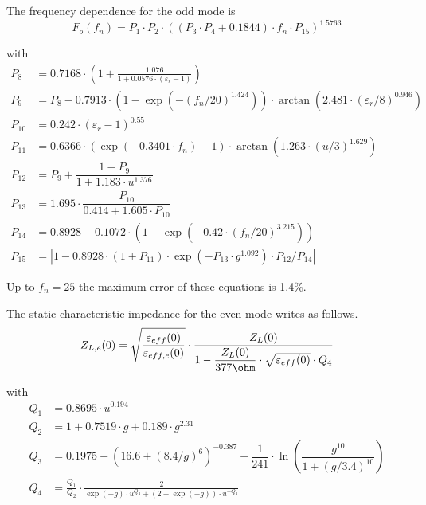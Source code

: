 \documentclass[10pt]{report}
\begin{document}
The frequency dependence for the odd mode is
\begin{equation}
F_o\left(f_n\right) = P_1\cdot P_2\cdot \left(\left(P_3\cdot P_4 + 0.1844\right)\cdot f_n\cdot P_{15}\right)^{1.5763}
\end{equation}

with
\begin{align}
P_8 &= 0.7168\cdot \left(1 + \frac{1.076}{1+0.0576\cdot \left(\varepsilon_r-1\right)} \right)\\
P_9 &= P_8 - 0.7913\cdot\left( 1-\exp\left( -\left( f_n/20\right) ^{1.424} \right) \right)
     \cdot\arctan\left( 2.481\cdot\left( \varepsilon_r/8\right) ^{0.946} \right)\\
P_{10} &= 0.242\cdot \left(\varepsilon_r-1\right)^{0.55}\\
P_{11} &= 0.6366\cdot \left(\exp\left(-0.3401\cdot f_n\right)-1\right) \cdot
      \arctan\left(1.263\cdot\left( u/3 \right) ^{1.629} \right)\\
P_{12} &= P_9 + \dfrac{1-P_9}{1+1.183\cdot u^{1.376}}\\
P_{13} &= 1.695\cdot \dfrac{P_{10}}{0.414+1.605\cdot P_{10}}\\
P_{14} &= 0.8928 + 0.1072\cdot \left( 1-\exp\left(-0.42\cdot\left(
        f_n/20 \right) ^{3.215} \right)\right)\\
P_{15} &= \left| 1 - 0.8928\cdot \left(1+P_{11}\right) \cdot \exp\left(-P_{13}\cdot g^{1.092}\right)\cdot
         P_{12}/P_{14} \right|
\end{align}

Up to $f_n=25$ the maximum error of these equations is 1.4\%.

\addvspace{12pt}

The static characteristic impedance for the even mode writes as follows.
\begin{equation}
Z_{L,e}(0) = \sqrt{\dfrac{\varepsilon_{eff}(0)}{\varepsilon_{eff,e}(0)}} \cdot
             \dfrac{Z_L(0)}{1 - \dfrac{Z_L(0)}{377\ohm} \cdot \sqrt{\varepsilon_{eff}(0)} \cdot Q_4}
\end{equation}

with
\begin{align}
Q_1 &= 0.8695\cdot u^{0.194}\\
Q_2 &= 1 + 0.7519\cdot g + 0.189\cdot g^{2.31}\\
Q_3 &= 0.1975 + \left( 16.6 + \left( 8.4/g \right) ^6 \right) ^{-0.387}
     + \dfrac{1}{241} \cdot \ln\left( \dfrac{g^{10}}{1+\left( g/3.4\right) ^{10}} \right)\\
Q_4 &= \frac{Q_1}{Q_2}\cdot \frac{2}{ \exp\left(-g\right)\cdot u^{Q_3} + (2-\exp\left(-g\right))\cdot u^{-Q_3} }
\end{align}
\end{document}
